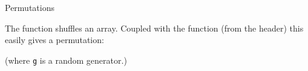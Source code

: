 \begin{comment}
  \Level 1 {Exercise}

  A \indextermbus{random}{walk} is a process
  where a position gets updated every time step.
  Every update is a displacement over a unit distance,
  in some random direction:
  \[ p_{i+1} = p_i + \overrightarrow r, \qquad \left|r\right|=1. \]

  This was originally invented as a way of modeling the spread of mosquitos:
  if a mosquito flies the same distance every day, but in a random direction,
  how far can it reach in its life span.

  \begin{exercise}
    Make \lstinline{Mosquito} class with a \lstinline{step} method.
    Calling this method updates the position of the mosquito
    by a random unit distance.
    Make the class so that the location can be in any number of dimensions.

    The main problem here is to compute the random displacement.
    \begin{itemize}
    \item You can use trigonometric functions to compute a point on the unit sphere.
    \item You also generate a point in a unit cube, and project it on the unit sphere.
    \end{itemize}
    In both cases, you have to be careful to let the points be uniform.
  \end{exercise}

  When you're convinced that your code is correct, explore the mathematics:

  \begin{exercise}
    Explore how far a mosquito can get from its starting point in $N$ days.
    Does this depend on the dimensionality~$d$?

    You may need to repeat every experiment a number of times
    to make it statistically significant.
  \end{exercise}
\end{comment}

 {Permutations}

The function  shuffles an array.
Coupled with the  function
(from the  header)
this easily gives a permutation:


(where \lstinline{g} is a random generator.)

